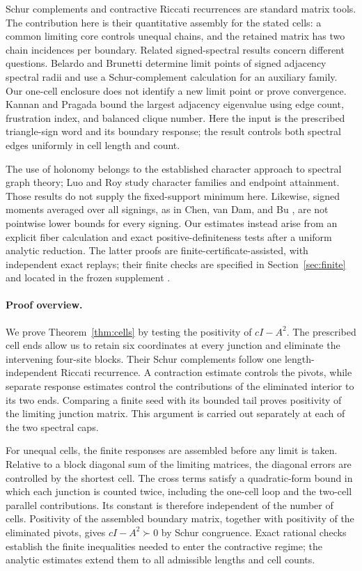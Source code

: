 Schur complements and contractive Riccati recurrences are standard matrix
tools. The contribution here is their quantitative assembly for the stated
cells: a common limiting core controls unequal chains, and the retained
matrix has two chain incidences per boundary. Related signed-spectral
results concern different questions. Belardo and Brunetti
\cite[Theorem 1.3 and Lemma 3.8]{BelardoBrunetti2024} determine limit points
of signed adjacency spectral radii and use a Schur-complement calculation
for an auxiliary family. Our one-cell enclosure does not identify a new
limit point or prove convergence. Kannan and Pragada
\cite[Theorem 3.3]{KannanPragada2023} bound the largest adjacency eigenvalue
using edge count, frustration index, and balanced clique number. Here the
input is the prescribed triangle-sign word and its boundary response; the
result controls both spectral edges uniformly in cell length and count.

The use of holonomy belongs to the established character approach to
spectral graph theory; Luo and Roy \cite[Theorems 3.6 and 3.13]{LuoRoy2026}
study character families and endpoint attainment. Those results do not
supply the fixed-support minimum here. Likewise, signed moments averaged
over all signings, as in Chen, van Dam, and Bu
\cite[Theorem 3.1]{ChenDamBu2024}, are not pointwise lower bounds for every
signing. Our estimates instead arise from an explicit fiber calculation
and exact positive-definiteness tests after a uniform analytic reduction.
The latter proofs are finite-certificate-assisted, with independent exact
replays; their finite checks are specified in Section~\ref{sec:finite} and
located in the frozen supplement \cite{C029Supplement}.

\paragraph{Proof overview.}
We prove Theorem~\ref{thm:cells} by testing the positivity of $cI-A^2$.
The prescribed cell ends allow us to retain six coordinates at every
junction and eliminate the intervening four-site blocks. Their Schur
complements follow one length-independent Riccati recurrence. A
contraction estimate controls the pivots, while separate response
estimates control the contributions of the eliminated interior to its
two ends. Comparing a finite seed with its bounded tail proves positivity
of the limiting junction matrix. This argument is carried out separately
at each of the two spectral caps.

For unequal cells, the finite responses are assembled before any limit
is taken. Relative to a block diagonal sum of the limiting matrices, the
diagonal errors are controlled by the shortest cell. The cross terms
satisfy a quadratic-form bound in which each junction is counted twice,
including the one-cell loop and the two-cell parallel contributions.
Its constant is therefore independent of the number of cells.
Positivity of the assembled boundary matrix, together with positivity of
the eliminated pivots, gives $cI-A^2\succ0$ by Schur congruence.
Exact rational checks establish the finite inequalities needed to enter
the contractive regime; the analytic estimates extend them to all
admissible lengths and cell counts.

